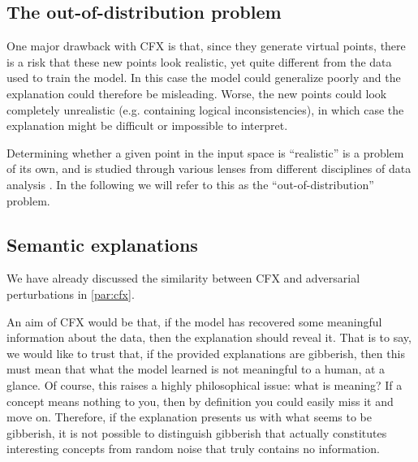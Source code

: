 \documentclass[../main.tex]{subfiles}
\begin{document}
\subsection{The out-of-distribution problem}

One major drawback with CFX is that, since they generate virtual points, there is a risk that these new points look realistic, yet quite different from the data used to train the model.
In this case the model could generalize poorly and the explanation could therefore be misleading.
Worse, the new points could look completely unrealistic (e.g. containing logical inconsistencies), in which case the explanation might be difficult or impossible to interpret.

Determining whether a given point in the input space is ``realistic'' is a problem of its own, and is studied through various lenses from different disciplines of data analysis \cite{yangGeneralized2022}.
In the following we will refer to this as the ``out-of-distribution'' problem.

\subsection{Semantic explanations}

We have already discussed the similarity between CFX and adversarial perturbations in \autoref{par:cfx}. 


An aim of CFX would be that, if the model has recovered some meaningful information about the data, then the explanation should reveal it. That is to say, we would like to trust that, if the provided explanations are gibberish, then this must mean that what the model learned is not meaningful to a human, at a glance.
Of course, this raises a highly philosophical issue: what is meaning? 
If a concept means nothing to you, then by definition you could easily miss it and move on.
Therefore, if the explanation presents us with what seems to be gibberish, it is not possible to distinguish gibberish that actually constitutes interesting concepts from random noise that truly contains no information.
\end{document}
